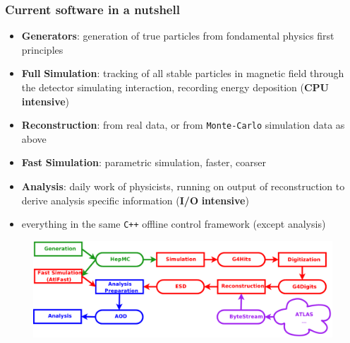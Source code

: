\documentclass[9pt]{beamer}
\begin{document}
\begin{frame}[fragile]
\frametitle{Current software in a nutshell}


\begin{itemize}
\item \textbf{Generators}: generation of true particles from fondamental physics first principles
\item \textbf{Full} \textbf{Simulation}: tracking of all stable particles in magnetic field through the detector simulating interaction, recording energy deposition (\textbf{CPU} \textbf{intensive})
\item \textbf{Reconstruction}: from real data, or from \texttt{Monte-Carlo} simulation data as above
\item \textbf{Fast} \textbf{Simulation}: parametric simulation, faster, coarser
\item \textbf{Analysis}: daily work of physicists, running on output of reconstruction to derive analysis specific information (\textbf{I/O} \textbf{intensive})
\item everything in the same \texttt{C++} offline control framework (except analysis)
\end{itemize}

\begin{figure}[h]
\begin{center}
\includegraphics[width=\textwidth]{_figs/data-flux-summary-all.png}
\end{center}

\end{figure}


\end{frame}
\end{document}
